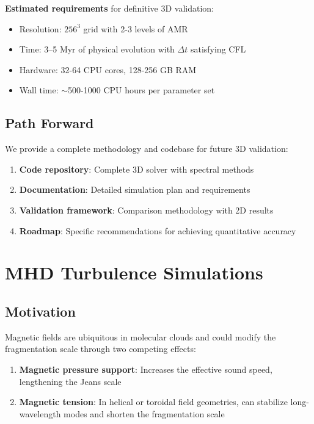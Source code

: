 \documentclass[11pt,a4paper]{article}
\begin{document}
\textbf{Estimated requirements} for definitive 3D validation:
\begin{itemize}
    \item Resolution: $256^3$ grid with 2-3 levels of AMR
    \item Time: 3--5 Myr of physical evolution with $\Delta t$ satisfying CFL
    \item Hardware: 32-64 CPU cores, 128-256 GB RAM
    \item Wall time: $\sim$500-1000 CPU hours per parameter set
\end{itemize}

\subsection{Path Forward}

We provide a complete methodology and codebase for future 3D validation:
\begin{enumerate}
    \item \textbf{Code repository}: Complete 3D solver with spectral methods
    \item \textbf{Documentation}: Detailed simulation plan and requirements
    \item \textbf{Validation framework}: Comparison methodology with 2D results
    \item \textbf{Roadmap}: Specific recommendations for achieving quantitative accuracy
\end{enumerate}

\section{MHD Turbulence Simulations}

\subsection{Motivation}

Magnetic fields are ubiquitous in molecular clouds and could modify the fragmentation scale through two competing effects:
\begin{enumerate}
    \item \textbf{Magnetic pressure support}: Increases the effective sound speed, lengthening the Jeans scale
    \item \textbf{Magnetic tension}: In helical or toroidal field geometries, can stabilize long-wavelength modes and shorten the fragmentation scale
\end{enumerate}
\end{document}
